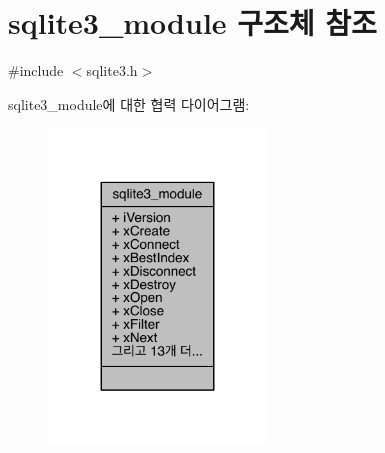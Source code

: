 \hypertarget{structsqlite3__module}{}\section{sqlite3\+\_\+module 구조체 참조}
\label{structsqlite3__module}


{\ttfamily \#include $<$sqlite3.\+h$>$}



sqlite3\+\_\+module에 대한 협력 다이어그램\+:
\nopagebreak
\begin{figure}[H]
\begin{center}
\leavevmode
\includegraphics[width=164pt]{dd/d7d/structsqlite3__module__coll__graph}
\end{center}
\end{figure}
